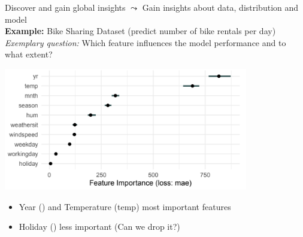 \documentclass[11pt,compress,t,notes=noshow, aspectratio=169, xcolor=table]{beamer}
\begin{document}



\begin{frame}{Discover and gain global insights}
$\leadsto$ Gain insights about data, distribution and model \\
\medskip
\textbf{Example:} Bike Sharing Dataset (predict number of bike rentals per day) \\
\textit{Exemplary question:} Which feature influences the model performance and to what extent?
\begin{center}
\includegraphics[width=0.8\textwidth]{figure/bike-sharing02.png}
\end{center}


\begin{itemize}
    \item Year () and Temperature (temp) most important features
    \item Holiday () less important (Can we drop it?)
\end{itemize}

\end{frame}

\end{document}
